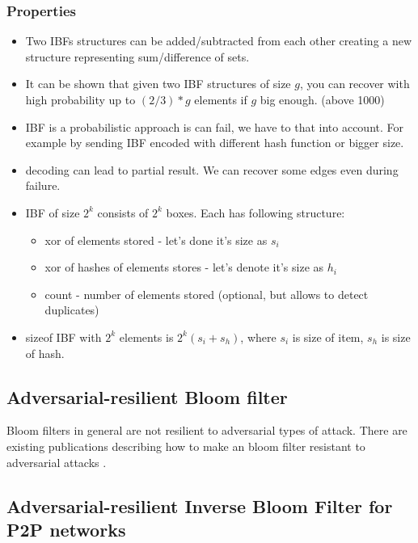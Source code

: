 \documentclass[11pt]{article}
\begin{document}
\subsubsection{Properties}
\begin{itemize}
\item Two IBFs structures can be added/subtracted from each other creating a new structure representing sum/difference of sets.
\item It can be shown that given two IBF structures of size $g$, you can recover with high probability up to $(2/3)*g$ elements if $g$ big enough. (above 1000)  \cite{esrwpc}
\item IBF is a probabilistic approach is can fail, we have to that into account.
For example by sending IBF encoded with different hash function or bigger size.
\item decoding can lead to partial result.
We can recover some edges even during failure.
\item IBF of size $2^k$ consists of $2^k$ boxes.
Each has following structure:
\begin{itemize}
\item xor of elements stored -  let's done it's size as $s_i$
\item xor of hashes of elements stores - let's denote it's size as $h_i$
\item count - number of elements stored (optional, but allows to detect duplicates)
\end{itemize}
\item sizeof IBF with $2^k$ elements is $2^k(s_i + s_h)$, where $s_i$ is size of item, $s_h$ is size of hash.
\end{itemize}


\subsection{Adversarial-resilient Bloom filter}
Bloom filters in general are not resilient to adversarial types of attack.
There are existing publications describing how to make an bloom filter resistant to adversarial attacks \cite{adversarial}.

\subsection{Adversarial-resilient Inverse Bloom Filter for P2P networks}
\end{document}
